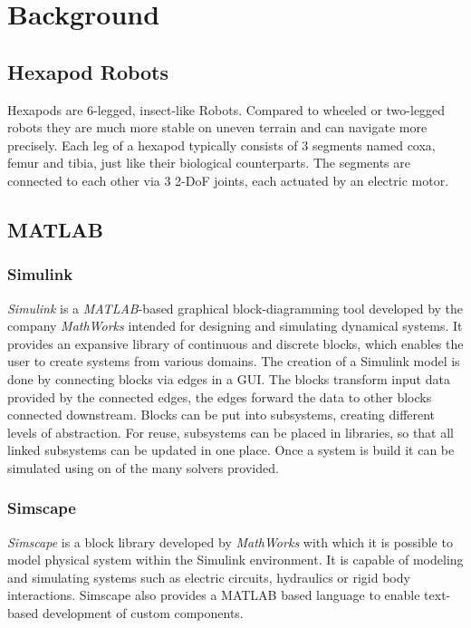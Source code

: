 \chapter{Background}
\label{ch:background}


\section{Hexapod Robots}
Hexapods are 6-legged, insect-like Robots.
Compared to wheeled or two-legged robots they are much more stable on uneven terrain and can navigate more precisely.
Each leg of a hexapod typically consists of 3 segments named coxa, femur and tibia, just like their biological counterparts.
The segments are connected to each other via 3 2-DoF joints, each actuated by an electric motor.


\section{MATLAB}
\subsection{Simulink}
\textit{Simulink\textsuperscript{\textregistered}} is a \textit{MATLAB\textsuperscript{\textregistered}}-based graphical block-diagramming tool developed by the company \textit{MathWorks\textsuperscript{\textregistered}} intended for designing and simulating dynamical systems.
It provides an expansive library of continuous and discrete blocks, which enables the user to create systems from various domains.
The creation of a Simulink model is done by connecting blocks via edges in a GUI.
The blocks transform input data provided by the connected edges, the edges forward the data to other blocks connected downstream.
Blocks can be put into subsystems, creating different levels of abstraction.
For reuse, subsystems can be placed in libraries, so that all linked subsystems can be updated in one place.
Once a system is build it can be simulated using on of the many solvers provided.

\subsection{Simscape}
\textit{Simscape\textsuperscript{\texttrademark}} is a block library developed by \textit{MathWorks\textsuperscript{\textregistered}} with which it is possible to model physical system within the Simulink environment.
It is capable of modeling and simulating systems such as electric circuits, hydraulics or rigid body interactions.
Simscape also provides a MATLAB based language to enable text-based development of custom components.
 




